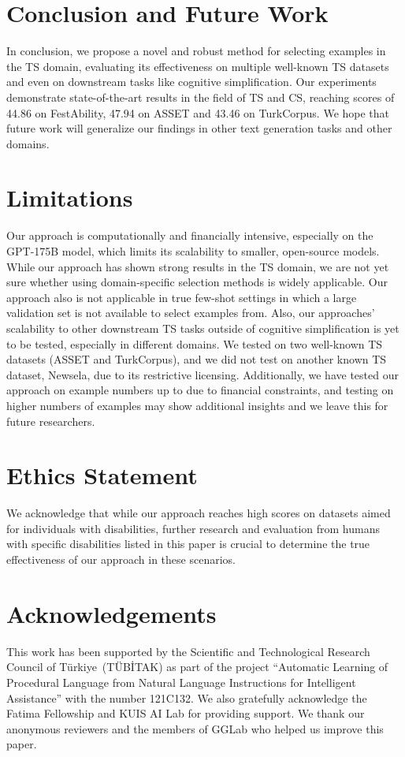 \documentclass[11pt]{article}
\begin{document}
\section{Conclusion and Future Work}
In conclusion, we propose a novel and robust method for selecting examples in the TS domain, evaluating its effectiveness on multiple well-known TS datasets and even on downstream tasks like cognitive simplification. Our experiments demonstrate state-of-the-art results in the field of TS and CS, reaching scores of 44.86 on FestAbility, 47.94 on ASSET and 43.46 on TurkCorpus. We hope that future work will generalize our findings in other text generation tasks and other domains. 

\section*{Limitations}

Our approach is computationally and financially intensive, especially on the GPT-175B model, which limits its scalability to smaller, open-source models. While our approach has shown strong results in the TS domain, we are not yet sure whether using domain-specific selection methods is widely applicable. Our approach also is not applicable in true few-shot settings in which a large validation set is not available to select examples from. Also, our approaches' scalability to other downstream TS tasks outside of cognitive simplification is yet to be tested, especially in different domains. We tested on two well-known TS datasets (ASSET and TurkCorpus), and we did not test on another known TS dataset, Newsela, due to its restrictive licensing. Additionally, we have tested our approach on example numbers up to  due to financial constraints, and testing on higher numbers of examples may show additional insights and we leave this for future researchers.


\section*{Ethics Statement}
We acknowledge that while our approach reaches high scores on datasets aimed for individuals with disabilities, further research and evaluation from humans with specific disabilities listed in this paper is crucial to determine the true effectiveness of our approach in these scenarios.


\section*{Acknowledgements}
This work has been supported by the Scientific and Technological Research Council of Türkiye~(TÜBİTAK) as part of the project ``Automatic Learning of Procedural Language from Natural Language Instructions for Intelligent Assistance'' with the number 121C132. We also gratefully acknowledge the Fatima Fellowship and KUIS AI Lab for providing support. We thank our anonymous reviewers and the members of GGLab who helped us improve this paper. 
\end{document}
